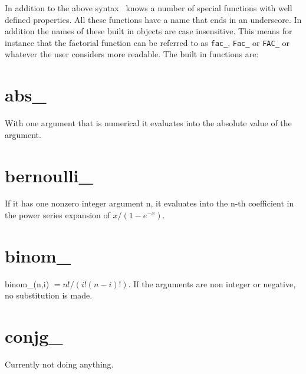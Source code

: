 


\noindent In addition to the above syntax \FORM\ knows a number of special 
functions with well defined properties. All these functions have a name 
that ends in an underscore. In addition the names of these built in objects 
are case insensitive. This means for instance that the factorial function 
can be referred to as \verb:fac_:, \verb:Fac_: or \verb:FAC_: or whatever 
the user considers more readable. The built in functions are:

\section{abs\_}
\label{funabs}
\noindent With one argument that is numerical it evaluates into the 
absolute value of the argument.

\section{bernoulli\_}
\label{funbernoulli}
\noindent If it has one nonzero integer argument n, it evaluates into 
the n-th coefficient in the power series expansion of $x/(1-e^{-x})$.

\section{binom\_}
\label{funbinom}
\noindent binom\_(n,i) $= n!/(i!(n-i)!)$. If the arguments are non 
integer or negative, no substitution is made.

\section{conjg\_}
\label{funconjg}
\noindent Currently not doing anything.

